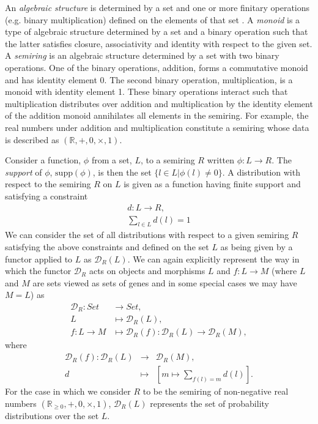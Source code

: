 An \emph{algebraic structure} is determined by a set and one or more finitary operations (e.g. binary multiplication) defined on the elements of that set \cite{PachterLior2005,Artin2010}. A \emph{monoid} is a type of algebraic structure determined by a set and a binary operation such that the latter satisfies closure, associativity and identity with respect to the given set. A \emph{semiring} is an algebraic structure determined by a set with two binary operations. One of the binary operations, addition, forms a commutative monoid and has identity element 0. The second binary operation, multiplication, is a monoid with identity element 1. These binary operations interact such that multiplication distributes over addition and multiplication by the identity element of the addition monoid annihilates all elements in the semiring. For example, the real numbers under addition and multiplication constitute a semiring whose data is described as $\left( \mathbb{R},+,0,\times,1 \right)$.

Consider a function, $\phi$ from a set, $L$, to a semiring $R$ written $\phi \colon L \rightarrow R$. The \emph{support} of $\phi$, $\text{supp}(\phi)$, is then the set $\{ l \in L | \phi(l) \neq 0 \}$. A distribution with respect to the semiring $R$ on $L$ is given as a function having finite support and satisfying a constraint
\begin{eqnarray*}
d \colon L \rightarrow R,\\
\sum_{l \in L} d(l) = 1
\end{eqnarray*}
We can consider the set of all distributions with respect to a given semiring $R$ satisfying the above constraints and defined on the set $L$ as being given by a functor applied to $L$ as $\mathcal{D}_R (L)$. We can again explicitly represent the way in which the functor $\mathcal{D}_R$ acts on objects and morphisms $L$ and $f \colon L \rightarrow M$ (where $L$ and $M$ are sets viewed as sets of genes and in some special cases we may have $M=L$) as
\begin{equation}\label{eq:distfunctor}
\begin{split}
\mathcal{D}_R \colon Set &\rightarrow Set,\\
L &\mapsto \mathcal{D}_R (L),\\
f \colon L \rightarrow M &\mapsto \mathcal{D}_R (f) \colon \mathcal{D}_R (L) \rightarrow \mathcal{D}_R (M),
\end{split}
\end{equation}
where
\begin{eqnarray*}
\mathcal{D}_R (f) \colon \mathcal{D}_R (L) &\rightarrow& \mathcal{D}_R (M),\\
d &\mapsto& \left[ m \mapsto \sum_{f(l)=m} d(l) \right].
\end{eqnarray*}
For the case in which we consider $R$ to be the semiring of non-negative real numbers $\left( \mathbb{R}_{\geq 0},+,0,\times,1 \right)$, $\mathcal{D}_R (L)$ represents the set of probability distributions over the set $L$.

